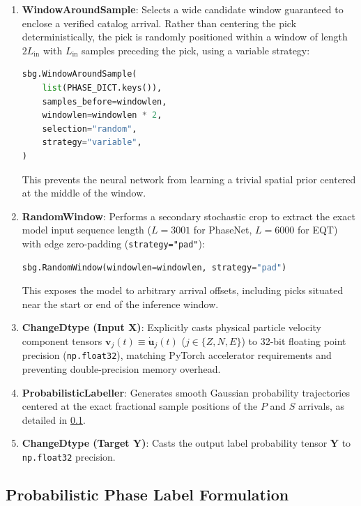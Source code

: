 \begin{enumerate}
  \item \textbf{WindowAroundSample}: Selects a wide candidate window
    guaranteed to
    enclose a verified catalog arrival. Rather than centering the
    pick deterministically,
    the pick is randomly positioned within a window of length $2
    L_{\mathrm{in}}$
    with $L_{\mathrm{in}}$ samples preceding the pick, using a
    variable strategy:
    \begin{lstlisting}[language=python,basicstyle=\scriptsize\ttfamily]
sbg.WindowAroundSample(
    list(PHASE_DICT.keys()),
    samples_before=windowlen,
    windowlen=windowlen * 2,
    selection="random",
    strategy="variable",
)
    \end{lstlisting}
    This prevents the neural network from learning a trivial spatial prior
    centered at the middle of the window.
  \item \textbf{RandomWindow}: Performs a secondary stochastic crop to extract
    the exact model input sequence length ($L = \num{3001}$ for \ac{PhaseNet},
    $L = \num{6000}$ for \ac{EQT}) with edge zero-padding
    (\texttt{strategy="pad"}):
    \begin{lstlisting}[language=python,basicstyle=\scriptsize\ttfamily]
sbg.RandomWindow(windowlen=windowlen, strategy="pad")
    \end{lstlisting}
    This exposes the model to arbitrary arrival offsets, including
    picks situated
    near the start or end of the inference window.
  \item \textbf{ChangeDtype (Input $\mathbf{X}$)}: Explicitly casts
    physical particle velocity component tensors
    $\mathbf{v}_j(t) \equiv \dot{\mathbf{u}}_j(t)$ ($j \in \{Z, N, E\}$)
    to 32-bit floating point precision (\texttt{np.float32}), matching
    PyTorch \parencite{PyTorch} accelerator requirements and
    preventing double-precision
    memory overhead.
  \item \textbf{ProbabilisticLabeller}: Generates smooth Gaussian probability
    trajectories centered at the exact fractional sample positions
    of the $P$ and $S$
    arrivals, as detailed in \cref{subsec:probabilistic_labeling}.
  \item \textbf{ChangeDtype (Target $\mathbf{Y}$)}: Casts the output
    label probability
    tensor $\mathbf{Y}$ to \texttt{np.float32} precision.
\end{enumerate}

\subsection{Probabilistic Phase Label Formulation}
\label{subsec:probabilistic_labeling}

